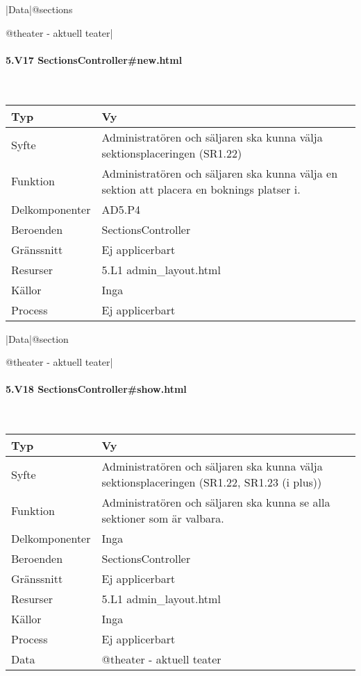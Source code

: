 \documentclass[a4paper, twoside, 11pt, titlepage]{article}
\begin{document}
			|Data|@sections

			@theater - aktuell teater|

			\paragraph{5.V17 SectionsController\#new.html}\

			\begin {table} [ht] \begin{tabular} {  p{3.5cm} p{9.6cm} }
				\hline
				Typ & Vy  \\
				\hline
				Syfte & Administratören och säljaren ska kunna välja sektionsplaceringen (SR1.22)  \\
				\hline
				Funktion & Administratören och säljaren ska kunna välja en sektion att placera en boknings platser i.  \\
				\hline
				Delkomponenter & AD5.P4  \\
				\hline
				Beroenden & SectionsController  \\
				\hline
				Gränssnitt & Ej applicerbart  \\
				\hline
				Resurser & 5.L1 admin\_layout.html  \\
				\hline
				Källor & Inga  \\
				\hline
				Process & Ej applicerbart  \\
				\hline
			\end{tabular} \end{table} \FloatBarrier
			\vspace{6mm}

			|Data|@section

			@theater - aktuell teater|

			\paragraph{5.V18 SectionsController\#show.html}\

			\begin {table} [ht] \begin{tabular} {  p{3.5cm} p{9.6cm} }
				\hline
				Typ & Vy  \\
				\hline
				Syfte & Administratören och säljaren ska kunna välja sektionsplaceringen (SR1.22, SR1.23 (i plus))  \\
				\hline
				Funktion & Administratören och säljaren ska kunna se alla sektioner som är valbara.  \\
				\hline
				Delkomponenter & Inga  \\
				\hline
				Beroenden & SectionsController  \\
				\hline
				Gränssnitt & Ej applicerbart  \\
				\hline
				Resurser & 5.L1 admin\_layout.html  \\
				\hline
				Källor & Inga  \\
				\hline
				Process & Ej applicerbart  \\
				\hline
				Data & @theater - aktuell teater  \\
				\hline
			\end{tabular} \end{table} \FloatBarrier
\end{document}
